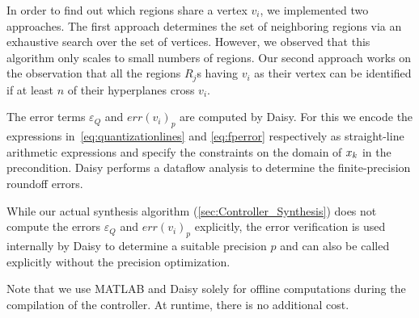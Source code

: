 In order to find out which regions share a vertex $v_i$, we implemented two approaches.
The first approach determines the set of neighboring regions via an exhaustive
search over the set of vertices. However, we observed that this algorithm only
scales to small numbers of regions.
Our second approach works on the observation that all the regions $R_j$s 
having $v_i$ as their vertex can be identified if at least $n$ of their hyperplanes cross $v_i$. 



The error terms $\varepsilon_Q$ and $err(v_{i})_{p}$ are computed by Daisy. For this we encode
the expressions in~\autoref{eq:quantizationlines} and \autoref{eq:fperror}
respectively as straight-line arithmetic expressions and specify the constraints
on the domain of $x_{k}$ in the precondition.
Daisy performs a dataflow analysis to determine the finite-precision roundoff
errors. 

While our actual synthesis algorithm (\autoref{sec:Controller_Synthesis}) does
not compute the errors $\varepsilon_Q$ and $err(v_{i})_{p}$ explicitly, the
error verification is used internally by Daisy to determine a suitable precision
$p$ and can also be called explicitly without the precision optimization. 

Note that we use MATLAB and Daisy solely for offline computations during the compilation of the controller.
At runtime, there is no additional cost.

